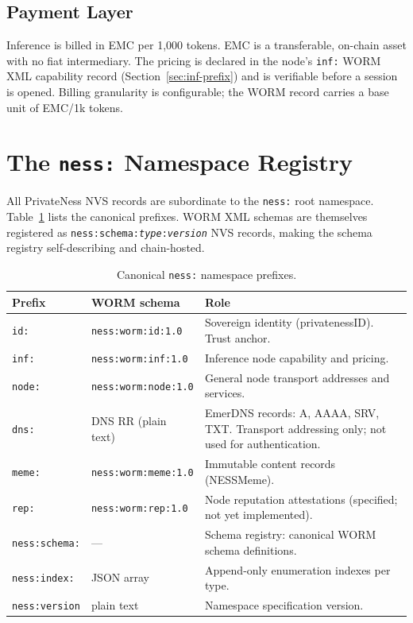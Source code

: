 \documentclass[11pt,a4paper]{article}
\theoremstyle{definition}
\begin{document}
\subsection{Payment Layer}

Inference is billed in EMC per 1,000 tokens.  EMC is a transferable,
on-chain asset with no fiat intermediary.  The pricing is declared in the
node's \texttt{inf:} WORM XML capability record (Section~\ref{sec:inf-prefix})
and is verifiable before a session is opened.  Billing granularity is
configurable; the WORM record carries a base unit of EMC/1k tokens.

\section{The \texttt{ness:} Namespace Registry}
\label{sec:namespace}

All PrivateNess NVS records are subordinate to the \texttt{ness:} root namespace.
Table~\ref{tab:prefixes} lists the canonical prefixes.  WORM XML schemas are
themselves registered as \texttt{ness:schema:\textit{type}:\textit{version}} NVS
records, making the schema registry self-describing and chain-hosted.

\begin{table}[ht]
\centering
\caption{Canonical \texttt{ness:} namespace prefixes.}
\label{tab:prefixes}
\begin{tabularx}{\textwidth}{@{}llX@{}}
\toprule
\textbf{Prefix} & \textbf{WORM schema} & \textbf{Role} \\
\midrule
\texttt{id:} & \texttt{ness:worm:id:1.0} & Sovereign identity (privatenessID). Trust anchor. \\
\texttt{inf:} & \texttt{ness:worm:inf:1.0} & Inference node capability and pricing. \\
\texttt{node:} & \texttt{ness:worm:node:1.0} & General node transport addresses and services. \\
\texttt{dns:} & DNS RR (plain text) & EmerDNS records: A, AAAA, SRV, TXT. Transport addressing only; not used for authentication. \\
\texttt{meme:} & \texttt{ness:worm:meme:1.0} & Immutable content records (NESSMeme). \\
\texttt{rep:} & \texttt{ness:worm:rep:1.0} & Node reputation attestations (specified; not yet implemented). \\
\texttt{ness:schema:} & --- & Schema registry: canonical WORM schema definitions. \\
\texttt{ness:index:} & JSON array & Append-only enumeration indexes per type. \\
\texttt{ness:version} & plain text & Namespace specification version. \\
\bottomrule
\end{tabularx}
\end{table}
\end{document}
